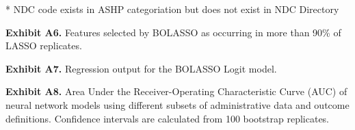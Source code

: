 \documentclass[11pt, letter]{article}
\begin{document}
* NDC code exists in ASHP categoriation but does not exist in NDC Directory
\normalsize

\newpage

\textbf{Exhibit A6.} Features selected by BOLASSO as occurring in more than 90\% of LASSO replicates.

\tiny

\normalsize

\newpage

\textbf{Exhibit A7.} Regression output for the BOLASSO Logit model.

\tiny

\normalsize

\newpage

\textbf{Exhibit A8.} Area Under the Receiver-Operating Characteristic Curve (AUC) of neural network models using different subsets of administrative data and outcome definitions. Confidence intervals are calculated from 100 bootstrap replicates.

\scriptsize

\normalsize

\newpage
\end{document}
